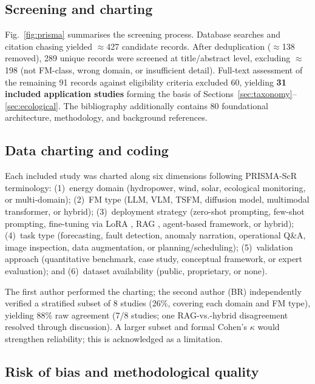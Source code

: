 \documentclass[preprint,12pt]{elsarticle}
\begin{document}
\subsection{Screening and charting}
\label{subsec:screening}

Fig.~\ref{fig:prisma} summarises the screening process. Database searches and citation chasing yielded $\approx$427 candidate records. After deduplication ($\approx$138 removed), 289 unique records were screened at title/abstract level, excluding $\approx$198 (not FM-class, wrong domain, or insufficient detail). Full-text assessment of the remaining 91 records against eligibility criteria excluded 60, yielding \textbf{31 included application studies} forming the basis of Sections~\ref{sec:taxonomy}--\ref{sec:ecological}. The bibliography additionally contains 80 foundational architecture, methodology, and background references.

\subsection{Data charting and coding}
\label{subsec:coding}

Each included study was charted along six dimensions following PRISMA-ScR terminology: (1)~energy domain (hydropower, wind, solar, ecological monitoring, or multi-domain); (2)~FM type (LLM, VLM, TSFM, diffusion model, multimodal transformer, or hybrid); (3)~deployment strategy (zero-shot prompting, few-shot prompting, fine-tuning via LoRA \cite{hu2022lora}, RAG \cite{lewis2020rag}, agent-based framework, or hybrid); (4)~task type (forecasting, fault detection, anomaly narration, operational Q\&A, image inspection, data augmentation, or planning/scheduling); (5)~validation approach (quantitative benchmark, case study, conceptual framework, or expert evaluation); and (6)~dataset availability (public, proprietary, or none).

The first author performed the charting; the second author (BR) independently verified a stratified subset of 8 studies (26\%, covering each domain and FM type), yielding 88\% raw agreement (7/8 studies; one RAG-vs.-hybrid disagreement resolved through discussion). A larger subset and formal Cohen's $\kappa$ would strengthen reliability; this is acknowledged as a limitation.

\subsection{Risk of bias and methodological quality}
\label{subsec:risk_of_bias}
\end{document}
